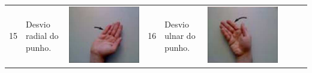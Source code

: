 \begin{table}[htb]
\begin{tabular}{m{0.5cm} m{1.5cm} m{2cm} | m{0.5cm} m{1.5cm} m{2cm} | m{0.5cm} m{1.5cm} m{2cm}}
		15	&	Desvio radial do punho.	& \includegraphics[width=\linewidth]{./img/moves/mov15.png} &
		16	&	Desvio ulnar do punho.	& \includegraphics[width=\linewidth]{./img/moves/mov16.png} &

\end{tabular}
\end{table}
